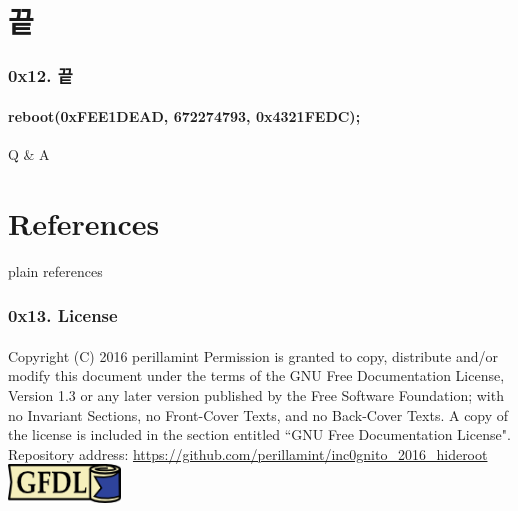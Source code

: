\section[Section]{끝}
\begin{frame}
  \frametitle{0x12. 끝}
  \framesubtitle{reboot(0xFEE1DEAD, 672274793, 0x4321FEDC);}

  \begin{center}
    Q \& A
  \end{center}
\end{frame}

\section[Section]{References}
 {plain}
 {references}

\begin{frame}
  \frametitle{0x13. License}
  \framesubtitle{}
  Copyright (C)  2016 perillamint\linebreak
  Permission is granted to copy, distribute and/or modify this document
  under the terms of the GNU Free Documentation License, Version 1.3
  or any later version published by the Free Software Foundation;\linebreak
  with no Invariant Sections, no Front-Cover Texts, and no Back-Cover Texts.
  A copy of the license is included in the section entitled ``GNU
  Free Documentation License".
  \linebreak
  \linebreak
  Repository address:\linebreak
  \url{https://github.com/perillamint/inc0gnito_2016_hideroot}
  \linebreak
  \linebreak
  \includegraphics [width=30mm]{img/gfdl-logo-small.png}
\end{frame}


